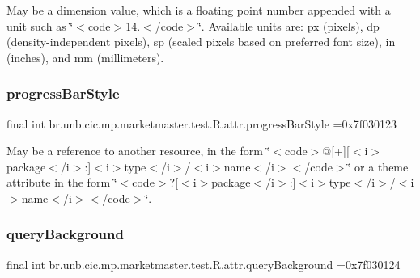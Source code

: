 May be a dimension value, which is a floating point number appended with a unit such as \char`\"{}$<$code$>$14.\+5sp$<$/code$>$\char`\"{}. Available units are\+: px (pixels), dp (density-\/independent pixels), sp (scaled pixels based on preferred font size), in (inches), and mm (millimeters). \mbox{\label{classbr_1_1unb_1_1cic_1_1mp_1_1marketmaster_1_1test_1_1R_1_1attr_a60222494b530e3e7eae4d72d368bd805}} 
\subsubsection{\texorpdfstring{progress\+Bar\+Style}{progressBarStyle}}
{\footnotesize\ttfamily final int br.\+unb.\+cic.\+mp.\+marketmaster.\+test.\+R.\+attr.\+progress\+Bar\+Style =0x7f030123\hspace{0.3cm}{\ttfamily [static]}}

May be a reference to another resource, in the form \char`\"{}$<$code$>$@\mbox{[}+\mbox{]}\mbox{[}$<$i$>$package$<$/i$>$\+:\mbox{]}$<$i$>$type$<$/i$>$/$<$i$>$name$<$/i$>$$<$/code$>$\char`\"{} or a theme attribute in the form \char`\"{}$<$code$>$?\mbox{[}$<$i$>$package$<$/i$>$\+:\mbox{]}$<$i$>$type$<$/i$>$/$<$i$>$name$<$/i$>$$<$/code$>$\char`\"{}. \mbox{\label{classbr_1_1unb_1_1cic_1_1mp_1_1marketmaster_1_1test_1_1R_1_1attr_a4587f98d9242a7631809e2980f3784bd}} 
\subsubsection{\texorpdfstring{query\+Background}{queryBackground}}
{\footnotesize\ttfamily final int br.\+unb.\+cic.\+mp.\+marketmaster.\+test.\+R.\+attr.\+query\+Background =0x7f030124\hspace{0.3cm}{\ttfamily [static]}}

